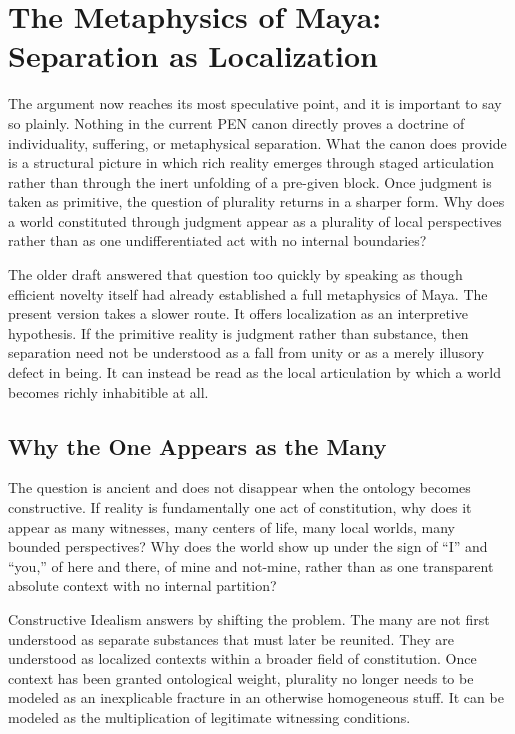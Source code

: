 \documentclass[11pt,a4paper]{article}
\theoremstyle{plain}
\theoremstyle{definition}
\theoremstyle{remark}
\begin{document}
\section{The Metaphysics of Maya: Separation as Localization}
\label{sec:maya}

The argument now reaches its most speculative point, and it is important to say so plainly.
Nothing in the current PEN canon directly proves a doctrine of individuality, suffering, or metaphysical separation.
What the canon does provide is a structural picture in which rich reality emerges through staged articulation rather than through the inert unfolding of a pre-given block.
Once judgment is taken as primitive, the question of plurality returns in a sharper form.
Why does a world constituted through judgment appear as a plurality of local perspectives rather than as one undifferentiated act with no internal boundaries?

The older draft answered that question too quickly by speaking as though efficient novelty itself had already established a full metaphysics of Maya.
The present version takes a slower route.
It offers localization as an interpretive hypothesis.
If the primitive reality is judgment rather than substance, then separation need not be understood as a fall from unity or as a merely illusory defect in being.
It can instead be read as the local articulation by which a world becomes richly inhabitible at all.

\subsection{Why the One Appears as the Many}
\label{subsec:one-many}

The question is ancient and does not disappear when the ontology becomes constructive.
If reality is fundamentally one act of constitution, why does it appear as many witnesses, many centers of life, many local worlds, many bounded perspectives?
Why does the world show up under the sign of ``I'' and ``you,'' of here and there, of mine and not-mine, rather than as one transparent absolute context with no internal partition?

Constructive Idealism answers by shifting the problem.
The many are not first understood as separate substances that must later be reunited.
They are understood as localized contexts within a broader field of constitution.
Once context has been granted ontological weight, plurality no longer needs to be modeled as an inexplicable fracture in an otherwise homogeneous stuff.
It can be modeled as the multiplication of legitimate witnessing conditions.
\end{document}
